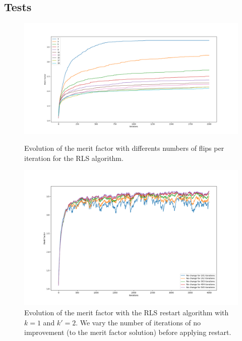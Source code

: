 \documentclass[a4paper,11pt,openany]{article}
\begin{document}
\subsection{Tests}
\begin{figure}[H]
\centering
\begin{minipage}{.45\textwidth}
  \begin{center}
  \includegraphics[scale=0.22]{Images/rls_nb_flip}
  \caption{Evolution of the merit factor with differents numbers of flips per iteration for the RLS algorithm.}
  \label{fig:rls_nb_flip}
  \end{center}
\end{minipage}%
\hfill
\begin{minipage}{.45\textwidth}
  \begin{center}
  \includegraphics[scale=0.25]{Images/rls_no_change}
  \caption{Evolution of the merit factor with the RLS restart algorithm with $k=1$ and $k'=2$. We vary the number of iterations of no improvement (to the merit factor solution) before applying restart.}
  \label{fig:rls_no_change}
  \end{center}
\end{minipage}
\end{figure}
\end{document}
